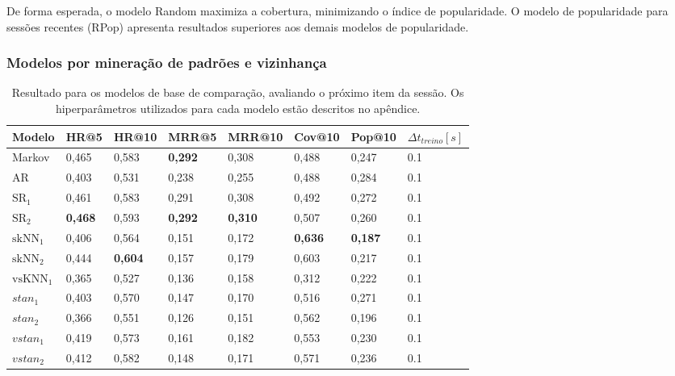 De forma esperada, o modelo Random maximiza a cobertura, minimizando o índice de
popularidade. O modelo de popularidade para sessões recentes (RPop) apresenta
resultados superiores aos demais modelos de popularidade.


\subsubsection{Modelos por mineração de padrões e vizinhança}

\begin{table}[htbp]
  \centering
  \begin{tabular}{|l|l|l|l|l|l|l|l|}
    \hline
    Modelo & HR@5 & HR@10 & MRR@5 & MRR@10 & Cov@10 & Pop@10 & $\Delta t_{treino} [s]$ \\
    \hline
    Markov  & 0,465 & 0,583 & \textbf{0,292} & 0,308 & 0,488 & 0,247 & 0.1 \\
    \hline
    AR & 0,403 & 0,531 & 0,238 & 0,255 & 0,488 & 0,284 & 0.1 \\
    \hline
    $\text{SR}_{1}$ & 0,461 & 0,583 & 0,291 & 0,308 & 0,492 & 0,272 & 0.1 \\
    \hline
    $\text{SR}_{2}$ & \textbf{0,468} & 0,593 & \textbf{0,292} & \textbf{0,310} & 0,507 & 0,260 & 0.1 \\
    \hline
    $\text{skNN}_{1}$ & 0,406 & 0,564 & 0,151 & 0,172 & \textbf{0,636} & \textbf{0,187} & 0.1 \\
    \hline
    $\text{skNN}_{2}$ & 0,444 & \textbf{0,604} & 0,157 & 0,179 & 0,603 & 0,217 & 0.1 \\
    \hline
    $\text{vsKNN}_{1}$ & 0,365 & 0,527 & 0,136 & 0,158 & 0,312 & 0,222 & 0.1 \\
    \hline
    $stan_{1}$ & 0,403 & 0,570 & 0,147 & 0,170 & 0,516 & 0,271 & 0.1 \\
    \hline
    $stan_{2}$ & 0,366 & 0,551 & 0,126 & 0,151 & 0,562 & 0,196 & 0.1 \\
    \hline
    $vstan_{1}$ & 0,419 & 0,573 & 0,161 & 0,182 & 0,553 & 0,230 & 0.1 \\
    \hline
    $vstan_{2}$ & 0,412 & 0,582 & 0,148 & 0,171 & 0,571 & 0,236 & 0.1 \\
    \hline
  \end{tabular}
  \caption{Resultado para os modelos de base de comparação, avaliando o próximo item da sessão.
  Os hiperparâmetros utilizados para cada modelo estão descritos no apêndice.}

\end{table}
